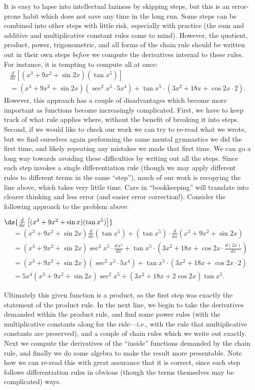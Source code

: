  It is easy to lapse into
intellectual laziness by skipping steps, but this is
an error-prone habit which does not save any time in the 
long run.  Some steps can be combined into other steps with little
risk, especially with practice (the sum
and additive and multiplicative constant rules come to mind).
However, the quotient, product, power, trigonometric, and
all forms  of the chain rule should be written out 
in their own steps {\it before} we compute the derivatives
internal to these rules.  For instance,
it is tempting to compute all at once:
\begin{multline*}
\frac{d}{dx}\left[(x^3+9x^2+\sin 2x)(\tan x^5)\right]
\\ =(x^3+9x^2+\sin2 x)(\sec^2x^5\cdot5x^4)
+\tan x^5\cdot(3x^2+18x+\cos2 x\cdot2).\end{multline*}
However, this approach has a couple of disadvantages
which become more important as functions become 
increasingly complicated.  First, we have to 
keep track of what rule applies where, without the
benefit of breaking it into steps.  Second, 
if we would like to check our work we can try to 
re-read what we wrote, but we find ourselves again
performing the same mental gymnastics we did the first 
time, and likely repeating any mistakes we made that first time.
We can go a long way towards avoiding
these difficulties by writing out all the steps.
Since each step invokes a single differentiation rule
(though we may apply different rules to different terms
in the same ``step''), much of our work is recopying the
line above, which takes very little time.  Care in
``bookkeeping'' will translate into clearer thinking
and less error (and easier error correction!).  Consider 
the following approach to the problem above:
\bigskip

$\ds{\frac{d}{dx}\left[(x^3+9x^2+\sin x)(\tan x^5)\right]
}$
\begin{align*}
{}&=\left(x^3+9x^2+\sin2x\right)\frac{d}{dx}\left(
       \tan x^5\right)+\left(\tan x^5\right)
       \cdot\frac{d}{dx}\left(x^3+9x^2+\sin2x\right)\\
&=\left(x^3+9x^2+\sin2x\right)\sec^2x^5\cdot\frac{d\,x^5}{dx}
+\tan x^5\cdot\left(3x^2+18x+\cos2x\cdot\frac{d(2x)}{dx}\right)\\
&=(x^3+9x^2+\sin2 x)(\sec^2x^5\cdot5x^4)
+\tan x^5\cdot(3x^2+18x+\cos2x\cdot 2)\\
&=5x^4(x^3+9x^2+\sin2x)\sec^2x^5+(3x^2+18x+2\cos2x)\tan x^5.
\end{align*}

Ultimately this given function is a product, so 
the first step was exactly the statement of the product rule.
In the next line, we begin to take the derivatives
demanded within the product rule, and find some power rules
(with the multiplicative constants along for the ride---i.e.,
with the rule that multiplicative constants are preserved),
and a couple of chain rules which we write out exactly.
Next we compute the derivatives of the ``inside''
functions demanded  by the chain rule, and finally we
do some algebra to make the result more presentable.
Note how we can re-read this with great assurance that it
is correct, since each step follows differentiation rules
in obvious (though the terms themselves may be complicated)
ways.

